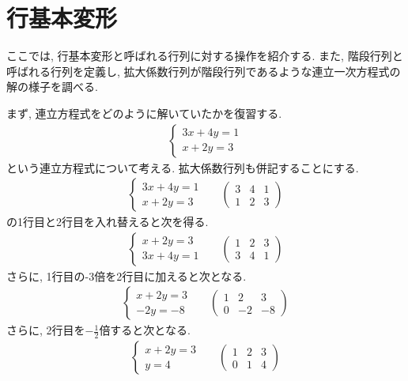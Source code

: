 \section{行基本変形}
ここでは, 行基本変形と呼ばれる行列に対する操作を紹介する.
また, 階段行列と呼ばれる行列を定義し,
拡大係数行列が階段行列であるような連立一次方程式の解の様子を調べる.

まず, 連立方程式をどのように解いていたかを復習する.
\begin{align*}
  \begin{cases}
    3x+4y=1\\
    x+2y=3
  \end{cases}
\end{align*}
という連立方程式について考える.
拡大係数行列も併記することにする.
\begin{align*}
  \begin{cases}
    3x+4y=1\\
    x+2y=3
  \end{cases}&&
  \begin{pmatrix}
    3&4&1\\
    1&2&3    
  \end{pmatrix}
\end{align*}
の1行目と2行目を入れ替えると次を得る.
\begin{align*}
  \begin{cases}
    x+2y=3\\
    3x+4y=1
  \end{cases}&&
  \begin{pmatrix}
    1&2&3\\    
    3&4&1
  \end{pmatrix}
\end{align*}
さらに,
1行目の-3倍を2行目に加えると次となる.
\begin{align*}
  \begin{cases}
    x+2y=3\\
     -2y=-8
  \end{cases}&&
  \begin{pmatrix}
    1&2&3\\    
    0&-2&-8
  \end{pmatrix}
\end{align*}
さらに,
2行目を$-\frac{1}{2}$倍すると次となる.
\begin{align*}
  \begin{cases}
    x+2y=3\\
     y=4
  \end{cases}&&
  \begin{pmatrix}
    1&2&3\\    
    0&1&4
  \end{pmatrix}
\end{align*}
